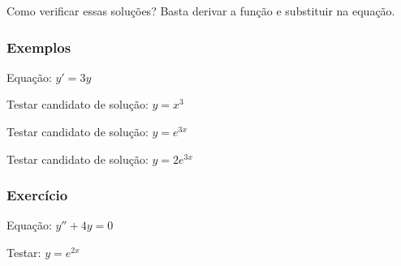 \documentclass[a4paper]{article}
\begin{document}
Como verificar essas soluções? Basta derivar a função e substituir na equação.

\subsubsection{Exemplos}

Equação: $y' = 3y$

Testar candidato de solução: $y=x^3$

Testar candidato de solução: $y=e^{3x}$

Testar candidato de solução: $y=2e^{3x}$

\subsubsection{Exercício}

Equação: $y'' + 4y = 0$

Testar: $y=e^{2x}$
\end{document}
